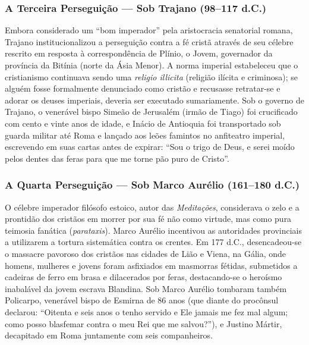 \documentclass[11pt,a4paper,openany]{book}
\begin{document}
\subsubsection*{A Terceira Perseguição — Sob Trajano (98–117 d.C.)}
Embora considerado um ``bom imperador'' pela aristocracia senatorial romana, Trajano institucionalizou a perseguição contra a fé cristã através de seu célebre rescrito em resposta à correspondência de Plínio, o Jovem, governador da província da Bitínia (norte da Ásia Menor). A norma imperial estabeleceu que o cristianismo continuava sendo uma \textit{religio illicita} (religião ilícita e criminosa); se alguém fosse formalmente denunciado como cristão e recusasse retratar-se e adorar os deuses imperiais, deveria ser executado sumariamente. Sob o governo de Trajano, o venerável bispo Simeão de Jerusalém (irmão de Tiago) foi crucificado com cento e vinte anos de idade, e Inácio de Antioquia foi transportado sob guarda militar até Roma e lançado aos leões famintos no anfiteatro imperial, escrevendo em suas cartas antes de expirar: ``Sou o trigo de Deus, e serei moído pelos dentes das feras para que me torne pão puro de Cristo''.


\subsubsection*{A Quarta Perseguição — Sob Marco Aurélio (161–180 d.C.)}
O célebre imperador filósofo estoico, autor das \textit{Meditações}, considerava o zelo e a prontidão dos cristãos em morrer por sua fé não como virtude, mas como pura teimosia fanática (\textit{parataxis}). Marco Aurélio incentivou as autoridades provinciais a utilizarem a tortura sistemática contra os crentes. Em 177 d.C., desencadeou-se o massacre pavoroso dos cristãos nas cidades de Lião e Viena, na Gália, onde homens, mulheres e jovens foram asfixiados em masmorras fétidas, submetidos a cadeiras de ferro em brasa e dilacerados por feras, destacando-se o heroísmo inabalável da jovem escrava Blandina. Sob Marco Aurélio tombaram também Policarpo, venerável bispo de Esmirna de 86 anos (que diante do procônsul declarou: ``Oitenta e seis anos o tenho servido e Ele jamais me fez mal algum; como posso blasfemar contra o meu Rei que me salvou?''), e Justino Mártir, decapitado em Roma juntamente com seis companheiros.
\end{document}
